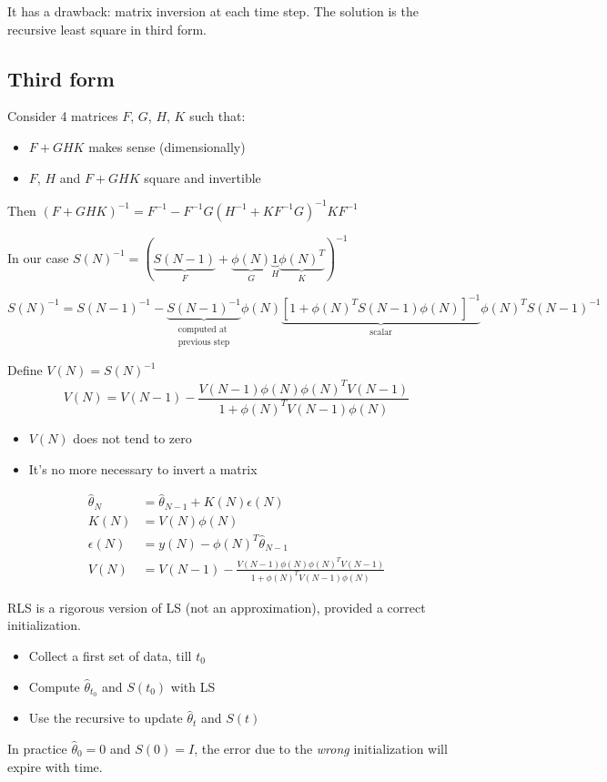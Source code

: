 It has a drawback: matrix inversion at each time step.
The solution is the recursive least square in third form.

\subsection{Third form}

\begin{lemma}
    Consider 4 matrices $F$, $G$, $H$, $K$ such that:
    \begin{itemize}
        \item $F+GHK$ makes sense (dimensionally)
        \item $F$, $H$ and $F+GHK$ square and invertible
    \end{itemize}
    Then $(F+GHK)^{-1} = F^{-1} - F^{-1}G(H^{-1} + KF^{-1}G)^{-1}KF^{-1}$
\end{lemma}

In our case $S(N)^{-1} = (\underbrace{S(N-1)}_F + \underbrace{\phi(N)}_G \underbrace{1}_H \underbrace{\phi(N)^T}_K )^{-1}$

\[
    S(N)^{-1} = S(N-1)^{-1} - \underbrace{S(N-1)^{-1}}_{\substack{\text{computed at}\\\text{previous step}}}\phi(N)\underbrace{\left[1 + \phi(N)^TS(N-1)\phi(N) \right]^{-1}}_\text{scalar}\phi(N)^TS(N-1)^{-1}
\]

Define $V(N) = S(N)^{-1}$
\[
    V(N) = V(N-1) - \frac{V(N-1)\phi(N)\phi(N)^TV(N-1)}{1+\phi(N)^TV(N-1)\phi(N)}
\]
\begin{itemize}
    \item $V(N)$ does not tend to zero
    \item It's no more necessary to invert a matrix
\end{itemize}

\begin{align*}
    \hat{\theta}_N &= \hat{\theta}_{N-1} + K(N)\epsilon(N) \\
    K(N) &= V(N)\phi(N) \\
    \epsilon(N) &= y(N) - \phi(N)^T\hat{\theta}_{N-1} \\
    V(N) &= V(N-1) - \frac{V(N-1)\phi(N)\phi(N)^TV(N-1)}{1+\phi(N)^TV(N-1)\phi(N)}
\end{align*}

\begin{remark}
    RLS is a rigorous version of LS (not an approximation), provided a correct initialization.


    \begin{itemize}
        \item Collect a first set of data, till $t_0$
        \item Compute $\hat{\theta}_{t_0}$ and $S(t_0)$ with LS
        \item Use the recursive to update $\hat{\theta}_t$ and $S(t)$
    \end{itemize}

    In practice $\hat{\theta}_0 = 0$ and $S(0) = I$, the error due to the \emph{wrong} initialization will expire with time.
\end{remark}

